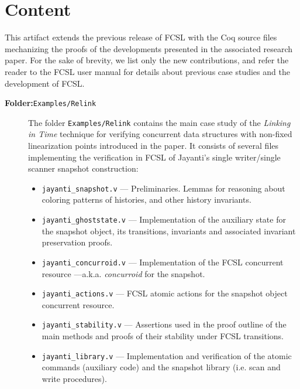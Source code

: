 \documentclass[a4paper,USenglish]{darts}
\newenvironment{content}{\section{Content}}{}
\begin{document}
\begin{content}

  This artifact extends the previous release of FCSL with the Coq
  source files mechanizing the proofs of the developments presented in
  the associated research paper. For the sake of brevity, we list only
  the new contributions, and refer the reader to the FCSL user manual
  for details about previous case studies and the development of FCSL.

\begin{description}
  
\item [{\bf \large Folder:}\texttt{Examples/Relink}] The folder
  \texttt{Examples/Relink} contains the main case study of the {\it
    Linking in Time} technique for verifying concurrent data
  structures with non-fixed linearization points introduced in the
  paper. It consists of several files implementing the verification in
  FCSL of Jayanti's single writer/single scanner snapshot
  construction:

\begin{itemize}

 \item \texttt{jayanti\_snapshot.v} --- Preliminaries. Lemmas for
       reasoning about coloring patterns of histories, and other
       history invariants.

 \item \texttt{jayanti\_ghoststate.v} --- Implementation of the
 auxiliary state for the snapshot object, its transitions, invariants
 and associated invariant preservation proofs.

 \item \texttt{jayanti\_concurroid.v} --- Implementation of the FCSL
 concurrent resource ---a.k.a. {\it concurroid} for the snapshot.

 \item \texttt{jayanti\_actions.v} --- FCSL atomic actions for the
 snapshot object concurrent resource.

 \item \texttt{jayanti\_stability.v} --- Assertions used in the proof
 outline of the main methods and proofs of their stability under FCSL
 transitions.

 \item \texttt{jayanti\_library.v} --- Implementation and verification
 of the atomic commands (auxiliary code) and the snapshot library
 (i.e. scan and write procedures).


\end{itemize}
\end{description}
\end{content}
\end{document}
